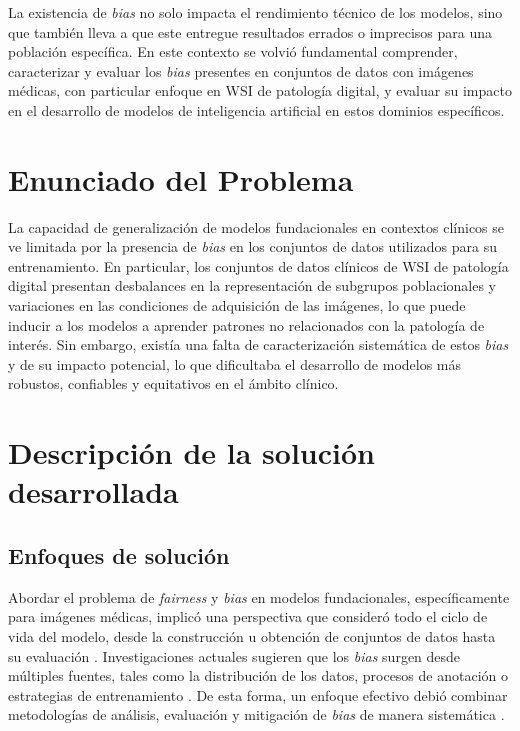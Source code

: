 La existencia de \textit{bias} no solo impacta el rendimiento técnico de los modelos, sino que también lleva a que este entregue resultados errados o imprecisos para una población específica. En este contexto se volvió fundamental comprender, caracterizar y evaluar los \textit{bias} presentes en conjuntos de datos con imágenes médicas, con particular enfoque en WSI de patología digital, y evaluar su impacto en el desarrollo de modelos de inteligencia artificial en estos dominios específicos.

\section{Enunciado del Problema}

La capacidad de generalización de modelos fundacionales en contextos clínicos se ve limitada por la presencia de \textit{bias} en los conjuntos de datos utilizados para su entrenamiento. En particular, los conjuntos de datos clínicos de WSI de patología digital presentan desbalances en la representación de subgrupos poblacionales y variaciones en las condiciones de adquisición de las imágenes, lo que puede inducir a los modelos a aprender patrones no relacionados con la patología de interés. Sin embargo, existía una falta de caracterización sistemática de estos \textit{bias} y de su impacto potencial, lo que dificultaba el desarrollo de modelos más robustos, confiables y equitativos en el ámbito clínico.

\section{Descripción de la solución desarrollada}

\subsection{Enfoques de solución}

Abordar el problema de \textit{fairness} y \textit{bias} en modelos fundacionales, específicamente para imágenes médicas, implicó una perspectiva que consideró todo el ciclo de vida del modelo, desde la construcción u obtención de conjuntos de datos hasta su evaluación \parencite{queiroz2026}. Investigaciones actuales sugieren que los \textit{bias} surgen desde múltiples fuentes, tales como la distribución de los datos, procesos de anotación o estrategias de entrenamiento \parencite{jones2024causal}. De esta forma, un enfoque efectivo debió combinar metodologías de análisis, evaluación y mitigación de \textit{bias} de manera sistemática \parencite{NEURIPS2024_c9826b9e}.

